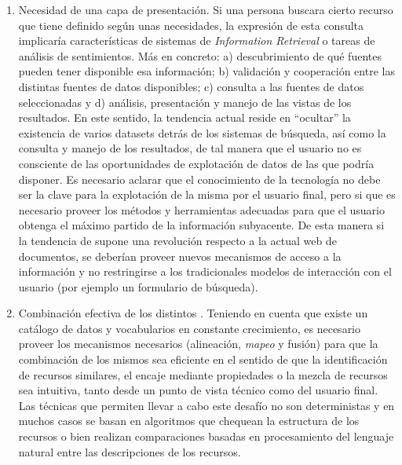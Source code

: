 \begin{enumerate}
 \item Necesidad de una capa de presentación. Si una persona buscara cierto recurso 
 que tiene definido según unas necesidades, la expresión de esta consulta implicaría características de 
sistemas de \textit{Information Retrieval} o tareas de análisis de sentimientos. Más en concreto: a) descubrimiento de qué fuentes pueden tener 
disponible esa información; b) validación y cooperación entre las distintas fuentes de datos disponibles; c) consulta a 
las fuentes de datos seleccionadas y d) análisis, presentación y manejo de las vistas de los resultados. En este sentido, la tendencia actual 
reside en ``ocultar'' la existencia de varios datasets detrás de los sistemas de búsqueda, así como la consulta y manejo de los 
resultados, de tal manera que el usuario no es consciente de las oportunidades de explotación de datos de las que podría disponer. 
Es necesario aclarar que el conocimiento de la tecnología no debe ser la clave para la explotación de la misma por el usuario 
final, pero si que es necesario proveer los métodos y herramientas adecuadas para que el usuario obtenga el máximo partido de 
la información subyacente. De esta manera si la tendencia de \linkeddata supone una revolución respecto a la actual web de documentos, se 
deberían proveer nuevos mecanismos de acceso a la información y no restringirse a los tradicionales modelos de interacción con el 
usuario (por ejemplo un formulario de búsqueda). 
\item Combinación efectiva de los distintos \datasets. Teniendo en cuenta que existe un catálogo de datos y 
  vocabularios en constante crecimiento, es necesario proveer los mecanismos necesarios (alineación, \textit{mapeo} y fusión) para que 
la combinación de los mismos sea eficiente en el sentido de que la identificación de recursos similares, el 
encaje mediante propiedades o la mezcla de recursos sea intuitiva, tanto desde un punto de vista técnico como del usuario final. 
Las técnicas que permiten llevar a cabo este desafío no son deterministas y en muchos casos se basan en algoritmos que chequean 
la estructura de los recursos o bien realizan comparaciones basadas en procesamiento del lenguaje natural entre las descripciones de los recursos.
\end{enumerate}

